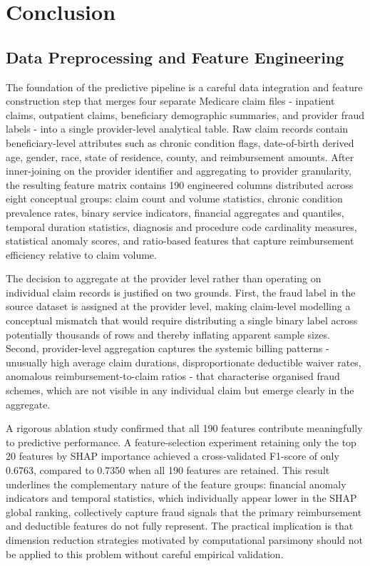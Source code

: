\section{Conclusion}

\subsection{Data Preprocessing and Feature Engineering}

The foundation of the predictive pipeline is a careful data integration and feature construction step that merges four separate Medicare claim files - inpatient claims, outpatient claims, beneficiary demographic summaries, and provider fraud labels - into a single provider-level analytical table. Raw claim records contain beneficiary-level attributes such as chronic condition flags, date-of-birth derived age, gender, race, state of residence, county, and reimbursement amounts. After inner-joining on the provider identifier and aggregating to provider granularity, the resulting feature matrix contains 190 engineered columns distributed across eight conceptual groups: claim count and volume statistics, chronic condition prevalence rates, binary service indicators, financial aggregates and quantiles, temporal duration statistics, diagnosis and procedure code cardinality measures, statistical anomaly scores, and ratio-based features that capture reimbursement efficiency relative to claim volume.

The decision to aggregate at the provider level rather than operating on individual claim records is justified on two grounds. First, the fraud label in the source dataset is assigned at the provider level, making claim-level modelling a conceptual mismatch that would require distributing a single binary label across potentially thousands of rows and thereby inflating apparent sample sizes. Second, provider-level aggregation captures the systemic billing patterns - unusually high average claim durations, disproportionate deductible waiver rates, anomalous reimbursement-to-claim ratios - that characterise organised fraud schemes, which are not visible in any individual claim but emerge clearly in the aggregate.

A rigorous ablation study confirmed that all 190 features contribute meaningfully to predictive performance. A feature-selection experiment retaining only the top 20 features by SHAP importance achieved a cross-validated F1-score of only 0.6763, compared to 0.7350 when all 190 features are retained. This result underlines the complementary nature of the feature groups: financial anomaly indicators and temporal statistics, which individually appear lower in the SHAP global ranking, collectively capture fraud signals that the primary reimbursement and deductible features do not fully represent. The practical implication is that dimension reduction strategies motivated by computational parsimony should not be applied to this problem without careful empirical validation.

